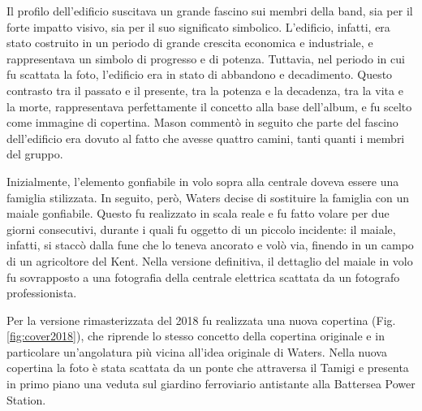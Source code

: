 \documentclass[class=book, crop=false, oneside, 12pt]{standalone}
\begin{document}
    Il profilo dell'edificio suscitava un grande fascino sui membri della band, sia per il forte impatto visivo, sia per il suo significato simbolico\cite{pinkfloyd2022animalsdocumentary}. L'edificio, infatti, era stato costruito in un periodo di grande crescita economica e industriale, e rappresentava un simbolo di progresso e di potenza. Tuttavia, nel periodo in cui fu scattata la foto, l'edificio era in stato di abbandono e decadimento. Questo contrasto tra il passato e il presente, tra la potenza e la decadenza, tra la vita e la morte, rappresentava perfettamente il concetto alla base dell'album, e fu scelto come immagine di copertina. Mason commentò in seguito che parte del fascino dell'edificio era dovuto al fatto che avesse quattro camini, tanti quanti i membri del gruppo\cite{mason2017inside}.

    Inizialmente, l'elemento gonfiabile in volo sopra alla centrale doveva essere una famiglia stilizzata. In seguito, però, Waters decise di sostituire la famiglia con un maiale gonfiabile. Questo fu realizzato in scala reale e fu fatto volare per due giorni consecutivi, durante i quali fu oggetto di un piccolo incidente: il maiale, infatti, si staccò dalla fune che lo teneva ancorato e volò via, finendo in un campo di un agricoltore del Kent\cite{pinkfloyd2022animalsdocumentary}. Nella versione definitiva, il dettaglio del maiale in volo fu sovrapposto a una fotografia della centrale elettrica scattata da un fotografo professionista\cite{mason2017inside}.
    
    Per la versione rimasterizzata del 2018 fu realizzata una nuova copertina (Fig.\ref{fig:cover2018}), che riprende lo stesso concetto della copertina originale e in particolare un'angolatura più vicina all'idea originale di Waters. Nella nuova copertina la foto è stata scattata da un ponte che attraversa il Tamigi e presenta in primo piano una veduta sul giardino ferroviario antistante alla Battersea Power Station.
\end{document}
